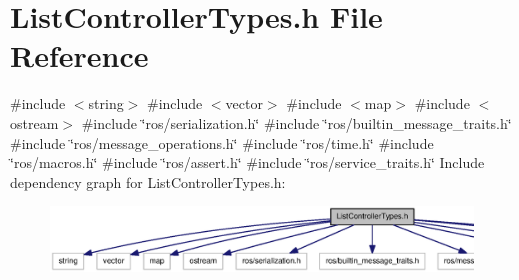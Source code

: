 \section{\-List\-Controller\-Types.\-h \-File \-Reference}
\label{ListControllerTypes_8h}
{\ttfamily \#include $<$string$>$}\*
{\ttfamily \#include $<$vector$>$}\*
{\ttfamily \#include $<$map$>$}\*
{\ttfamily \#include $<$ostream$>$}\*
{\ttfamily \#include \char`\"{}ros/serialization.\-h\char`\"{}}\*
{\ttfamily \#include \char`\"{}ros/builtin\-\_\-message\-\_\-traits.\-h\char`\"{}}\*
{\ttfamily \#include \char`\"{}ros/message\-\_\-operations.\-h\char`\"{}}\*
{\ttfamily \#include \char`\"{}ros/time.\-h\char`\"{}}\*
{\ttfamily \#include \char`\"{}ros/macros.\-h\char`\"{}}\*
{\ttfamily \#include \char`\"{}ros/assert.\-h\char`\"{}}\*
{\ttfamily \#include \char`\"{}ros/service\-\_\-traits.\-h\char`\"{}}\*
\-Include dependency graph for \-List\-Controller\-Types.\-h\-:
\nopagebreak
\begin{figure}[H]
\begin{center}
\leavevmode
\includegraphics[width=350pt]{ListControllerTypes_8h__incl}
\end{center}
\end{figure}
